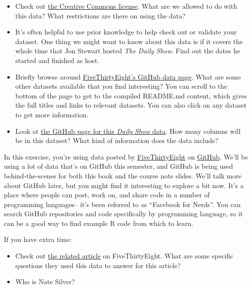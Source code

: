 \documentclass[]{book}
\makeatletter
\providecommand{\tightlist}{%
  \setlength{\itemsep}{0pt}\setlength{\parskip}{0pt}}
\newenvironment{kframe}{%
\medskip{}
\setlength{\fboxsep}{.8em}
 \def\at@end@of@kframe{}%
 \ifinner\ifhmode%
  \def\at@end@of@kframe{\end{minipage}}%
  \begin{minipage}{\columnwidth}%
 \fi\fi%
 \def\FrameCommand##1{\hskip\@totalleftmargin \hskip-\fboxsep
 \colorbox{shadecolor}{##1}\hskip-\fboxsep
     \hskip-\linewidth \hskip-\@totalleftmargin \hskip\columnwidth}%
 \MakeFramed {\advance\hsize-\width
   \@totalleftmargin\z@ \linewidth\hsize
   \@setminipage}}%
 {\par\unskip\endMakeFramed%
 \at@end@of@kframe}
\newenvironment{rmdblock}[1]
  {
  \begin{itemize}
  \renewcommand{\labelitemi}{
    \raisebox{-.7\height}[0pt][0pt]{
      {\setkeys{Gin}{width=3em,keepaspectratio}\texttt{[image: images/\#1]}}
    }
  }
  \setlength{\fboxsep}{1em}
  \begin{kframe}
  \item
  }
  {
  \end{kframe}
  \end{itemize}
  }
\newenvironment{rmdnote}
  {\begin{rmdblock}{note}}
  {\end{rmdblock}}
\theoremstyle{definition}
\theoremstyle{definition}
\theoremstyle{definition}
\theoremstyle{remark}
\makeatother
\begin{document}
\begin{itemize}
\tightlist
\item
  Check out \href{http://creativecommons.org/licenses/by/4.0/}{the
  Creative Commons license}. What are we allowed to do with this data?
  What restrictions are there on using the data?
\item
  It's often helpful to use prior knowledge to help check out or
  validate your dataset. One thing we might want to know about this data
  is if it covers the whole time that Jon Stewart hosted \emph{The Daily
  Show}. Find out the dates he started and finished as host.
\item
  Briefly browse around
  \href{https://github.com/fivethirtyeight/data}{FiveThirtyEight's
  GitHub data page}. What are some other datasets available that you
  find interesting? You can scroll to the bottom of the page to get to
  the compiled README.md content, which gives the full titles and links
  to relevant datasets. You can also click on any dataset to get more
  information.
\item
  Look at
  \href{https://github.com/fivethirtyeight/data/tree/master/daily-show-guests}{the
  GitHub page for this \emph{Daily Show} data}. How many columns will be
  in this dataset? What kind of information does the data include?
\end{itemize}

\begin{rmdnote}
In this exercise, you're using data posted by
\href{http://fivethirtyeight.com}{FiveThirtyEight} on
\href{https://github.com}{GitHub}. We'll be using a lot of data that's
on GitHub this semester, and GitHub is being used behind-the-scenes for
both this book and the course note slides. We'll talk more about GitHub
later, but you might find it interesting to explore a bit now. It's a
place where people can post, work on, and share code in a number of
programming languages-- it's been referred to as ``Facebook for Nerds''.
You can search GitHub repositories and code specifically by programming
language, so it can be a good way to find example R code from which to
learn.
\end{rmdnote}

If you have extra time:

\begin{itemize}
\tightlist
\item
  Check out
  \href{http://fivethirtyeight.com/datalab/every-guest-jon-stewart-ever-had-on-the-daily-show/}{the
  related article} on FiveThirtyEight. What are some specific questions
  they used this data to answer for this article?
\item
  Who is Nate Silver?
\end{itemize}
\end{document}
